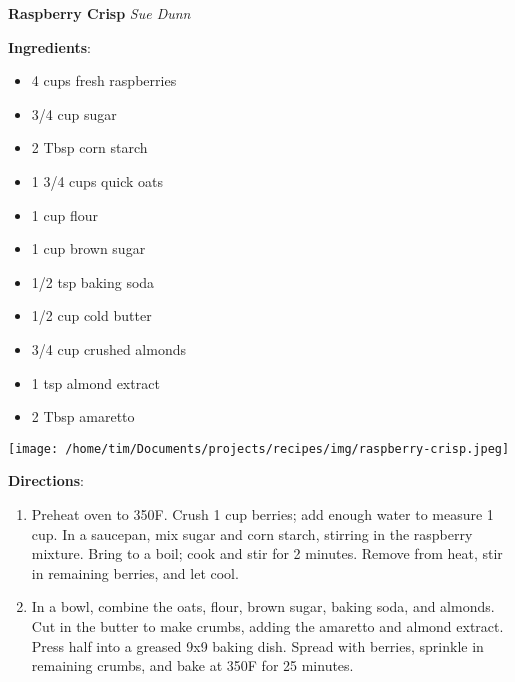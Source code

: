 \documentclass[11pt, twoside, openany]{book}
\begin{document}
\noindent\begin{minipage}[t]{\linewidth}%
{\Large\textbf{Raspberry Crisp}} \label{raspberry-crisp}\hfill\textit{Sue Dunn}\\
\noindent\begin{minipage}[t]{0.78\linewidth}%
\textbf{Ingredients}:\vspace{-3mm}
\begin{multicols}{2}
\begin{itemize}\setlength\itemsep{-1mm}
\item 4 cups fresh raspberries
\item 3/4 cup sugar
\item 2 Tbsp corn starch
\item 1 3/4 cups quick oats
\item 1 cup flour
\item 1 cup brown sugar
\item 1/2 tsp baking soda
\item 1/2 cup cold butter
\item 3/4 cup crushed almonds
\item 1 tsp almond extract
\item 2 Tbsp amaretto
\end{itemize}
\end{multicols}
\end{minipage}
\noindent\begin{minipage}[t]{0.18\linewidth}
\centering \strut\vspace*{-\baselineskip}\newline
\texttt{[image: /home/tim/Documents/projects/recipes/img/raspberry-crisp.jpeg]}\\
\end{minipage}\vspace{3mm}
\textbf{Directions}:
\vspace{-3mm}\begin{enumerate}\setlength\itemsep{-1mm}
\item Preheat oven to 350F. Crush 1 cup berries; add enough water to measure 1 cup. In a saucepan, mix sugar and corn starch, stirring in the raspberry mixture. Bring to a boil; cook and stir for 2 minutes. Remove from heat, stir in remaining berries, and let cool.
\item In a bowl, combine the oats, flour, brown sugar, baking soda, and almonds. Cut in the butter to make crumbs, adding the amaretto and almond extract. Press half into a greased 9x9 baking dish. Spread with berries, sprinkle in remaining crumbs, and bake at 350F for 25 minutes.
\end{enumerate}
\end{minipage}\vspace{8mm}
\end{document}
